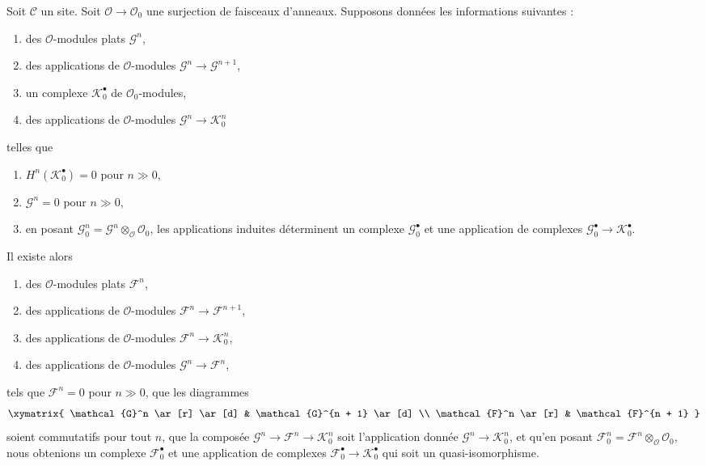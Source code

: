 \begin{lemma}
\label{lemma-lift-complex}
Soit $\mathcal{C}$ un site. Soit $\mathcal{O} \to \mathcal{O}_0$ une
surjection de faisceaux d'anneaux. Supposons données les informations
suivantes :
\begin{enumerate}
\item des $\mathcal{O}$-modules plats $\mathcal{G}^n$,
\item des applications de $\mathcal{O}$-modules
$\mathcal{G}^n \to \mathcal{G}^{n + 1}$,
\item un complexe $\mathcal{K}_0^\bullet$ de $\mathcal{O}_0$-modules,
\item des applications de $\mathcal{O}$-modules
$\mathcal{G}^n \to \mathcal{K}_0^n$
\end{enumerate}
telles que
\begin{enumerate}
\item[(a)] $H^n(\mathcal{K}_0^\bullet) = 0$ pour $n \gg 0$,
\item[(b)] $\mathcal{G}^n = 0$ pour $n \gg 0$,
\item[(c)] en posant
$\mathcal{G}^n_0 = \mathcal{G}^n \otimes_\mathcal{O} \mathcal{O}_0$, les
applications induites déterminent un complexe $\mathcal{G}_0^\bullet$ et une
application de complexes
$\mathcal{G}_0^\bullet \to \mathcal{K}_0^\bullet$.
\end{enumerate}
Il existe alors
\begin{enumerate}
\item[(\romannumeral1)]
des $\mathcal{O}$-modules plats $\mathcal{F}^n$,
\item[(\romannumeral2)]
des applications de $\mathcal{O}$-modules
$\mathcal{F}^n \to \mathcal{F}^{n + 1}$,
\item[(\romannumeral3)]
des applications de $\mathcal{O}$-modules
$\mathcal{F}^n \to \mathcal{K}_0^n$,
\item[(\romannumeral4)]
des applications de $\mathcal{O}$-modules
$\mathcal{G}^n \to \mathcal{F}^n$,
\end{enumerate}
tels que $\mathcal{F}^n = 0$ pour $n \gg 0$, que les diagrammes
$$
\xymatrix{
\mathcal{G}^n \ar[r] \ar[d] & \mathcal{G}^{n + 1} \ar[d] \\
\mathcal{F}^n \ar[r] & \mathcal{F}^{n + 1}
}
$$
soient commutatifs pour tout $n$, que la composée
$\mathcal{G}^n \to \mathcal{F}^n \to \mathcal{K}_0^n$ soit l'application
donnée $\mathcal{G}^n \to \mathcal{K}_0^n$, et qu'en posant
$\mathcal{F}^n_0 = \mathcal{F}^n \otimes_\mathcal{O} \mathcal{O}_0$, nous
obtenions un complexe $\mathcal{F}_0^\bullet$ et une application de complexes
$\mathcal{F}_0^\bullet \to \mathcal{K}_0^\bullet$ qui soit un
quasi-isomorphisme.
\end{lemma}

